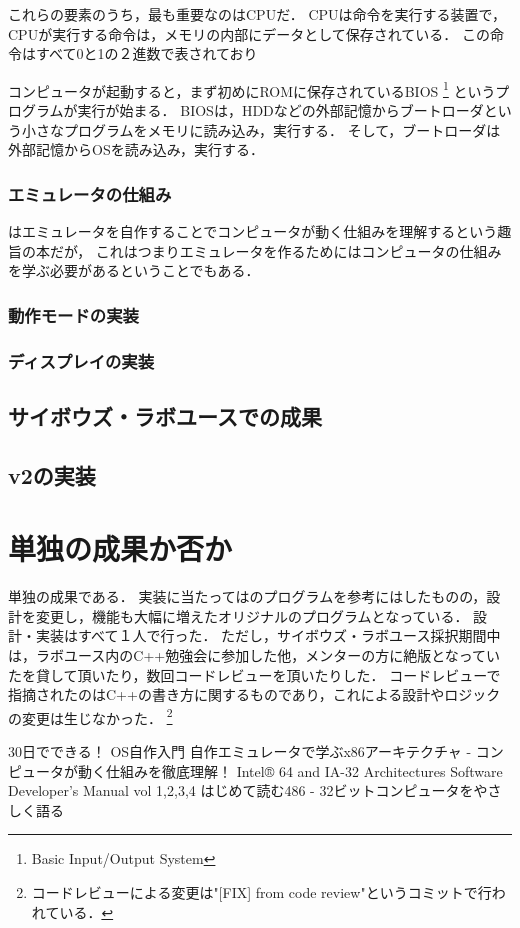 \documentclass[10pt,a4j]{jsarticle}
\begin{document}
これらの要素のうち，最も重要なのはCPUだ．
CPUは命令を実行する装置で，
CPUが実行する命令は，メモリの内部にデータとして保存されている．
この命令はすべて0と1の２進数で表されており

コンピュータが起動すると，まず初めにROMに保存されているBIOS
\footnote{Basic Input/Output System}
というプログラムが実行が始まる．
BIOSは，HDDなどの外部記憶からブートローダという小さなプログラムをメモリに読み込み，実行する．
そして，ブートローダは外部記憶からOSを読み込み，実行する．

\subsubsection{エミュレータの仕組み}
\cite{learn-x86-by-emu}はエミュレータを自作することでコンピュータが動く仕組みを理解するという趣旨の本だが，
これはつまりエミュレータを作るためにはコンピュータの仕組みを学ぶ必要があるということでもある．



\subsubsection{動作モードの実装}

\subsubsection{ディスプレイの実装}


\subsection{サイボウズ・ラボユースでの成果}

\subsection{v2の実装}

\section{単独の成果か否か}
単独の成果である．
実装に当たっては\cite{learn-x86-by-emu}のプログラムを参考にはしたものの，設計を変更し，機能も大幅に増えたオリジナルのプログラムとなっている．
設計・実装はすべて１人で行った．
ただし，サイボウズ・ラボユース採択期間中は，ラボユース内のC++勉強会に参加した他，メンターの方に絶版となっていた\cite{read-486}を貸して頂いたり，数回コードレビューを頂いたりした．
コードレビューで指摘されたのはC++の書き方に関するものであり，これによる設計やロジックの変更は生じなかった．
\footnote{コードレビューによる変更は"[FIX] from code review"というコミットで行われている．}


\begin{thebibliography}{99}
	 30日でできる！ OS自作入門
	 自作エミュレータで学ぶx86アーキテクチャ - コンピュータが動く仕組みを徹底理解！
	 Intel® 64 and IA-32 Architectures Software Developer’s Manual vol 1,2,3,4
	 はじめて読む486 - 32ビットコンピュータをやさしく語る
\end{thebibliography}
\end{document}
